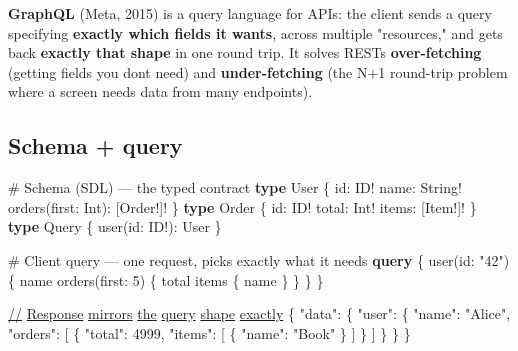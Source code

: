 \documentclass[11pt]{article}
\newenvironment{Shaded}{\begin{snugshade}}{\end{snugshade}}
\newcommand{\CommentTok}[1]{\textcolor[rgb]{0.48,0.49,0.49}{#1}}
\newcommand{\DataTypeTok}[1]{\textcolor[rgb]{0.16,0.50,0.73}{#1}}
\newcommand{\DecValTok}[1]{\textcolor[rgb]{0.96,0.45,0.00}{#1}}
\newcommand{\ErrorTok}[1]{\textcolor[rgb]{0.85,0.27,0.33}{\underline{#1}}}
\newcommand{\FunctionTok}[1]{\textcolor[rgb]{0.56,0.27,0.68}{#1}}
\newcommand{\KeywordTok}[1]{\textcolor[rgb]{0.81,0.81,0.76}{\textbf{#1}}}
\newcommand{\NormalTok}[1]{\textcolor[rgb]{0.81,0.81,0.76}{#1}}
\newcommand{\OtherTok}[1]{\textcolor[rgb]{0.15,0.68,0.38}{#1}}
\newcommand{\StringTok}[1]{\textcolor[rgb]{0.96,0.31,0.31}{#1}}
\begin{document}
\textbf{GraphQL} (Meta, 2015) is a query language for APIs: the client sends a query specifying \textbf{exactly which fields it wants}, across multiple "resources," and gets back \textbf{exactly that shape} in one round trip. It solves REST\textquotesingle s \textbf{over-fetching} (getting fields you don\textquotesingle t need) and \textbf{under-fetching} (the N+1 round-trip problem where a screen needs data from many endpoints).

\subsection{Schema + query}\label{schema--query}


\begin{Shaded}
\begin{Highlighting}[]
\CommentTok{\# Schema (SDL) — the typed contract}
\KeywordTok{type}\NormalTok{ User \{}
\NormalTok{  id: }\DataTypeTok{ID}\NormalTok{!}
\NormalTok{  name: }\DataTypeTok{String}\NormalTok{!}
\NormalTok{  orders(first: }\DataTypeTok{Int}\NormalTok{): [Order!]!}
\NormalTok{\}}
\KeywordTok{type}\NormalTok{ Order \{}
\NormalTok{  id: }\DataTypeTok{ID}\NormalTok{!}
\NormalTok{  total: }\DataTypeTok{Int}\NormalTok{!}
\NormalTok{  items: [Item!]!}
\NormalTok{\}}
\KeywordTok{type}\NormalTok{ Query \{}
\NormalTok{  user(id: }\DataTypeTok{ID}\NormalTok{!): User}
\NormalTok{\}}
\end{Highlighting}
\end{Shaded}


\begin{Shaded}
\begin{Highlighting}[]
\CommentTok{\# Client query — one request, picks exactly what it needs}
\KeywordTok{query}\NormalTok{ \{}
\NormalTok{  user(id: }\StringTok{"42"}\NormalTok{) \{}
\NormalTok{    name}
\NormalTok{    orders(first: }\DecValTok{5}\NormalTok{) \{}
\NormalTok{      total}
\NormalTok{      items \{ name \}}
\NormalTok{    \}}
\NormalTok{  \}}
\NormalTok{\}}
\end{Highlighting}
\end{Shaded}


\begin{Shaded}
\begin{Highlighting}[]
\ErrorTok{//} \ErrorTok{Response} \ErrorTok{mirrors} \ErrorTok{the} \ErrorTok{query} \ErrorTok{shape} \ErrorTok{exactly}
\FunctionTok{\{} \DataTypeTok{"data"}\FunctionTok{:} \FunctionTok{\{} \DataTypeTok{"user"}\FunctionTok{:} \FunctionTok{\{} \DataTypeTok{"name"}\FunctionTok{:} \StringTok{"Alice"}\FunctionTok{,}
  \DataTypeTok{"orders"}\FunctionTok{:} \OtherTok{[} \FunctionTok{\{} \DataTypeTok{"total"}\FunctionTok{:} \DecValTok{4999}\FunctionTok{,} \DataTypeTok{"items"}\FunctionTok{:} \OtherTok{[} \FunctionTok{\{} \DataTypeTok{"name"}\FunctionTok{:} \StringTok{"Book"} \FunctionTok{\}} \OtherTok{]} \FunctionTok{\}} \OtherTok{]} \FunctionTok{\}} \FunctionTok{\}} \FunctionTok{\}}
\end{Highlighting}
\end{Shaded}
\end{document}
